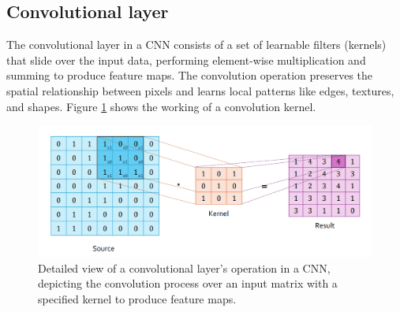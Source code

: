 \subsection{Convolutional layer}
The convolutional layer in a CNN consists of a set of learnable filters (kernels) that slide over the input data, performing element-wise multiplication and summing to produce feature maps. The convolution operation preserves the spatial relationship between pixels and learns local patterns like edges, textures, and shapes. Figure \ref{fig:Conv1} shows the working of a convolution kernel. 
\begin{figure}[ht]
    \centeringflo
    \includegraphics[width=14cm]{images/Theory-DL/Conv1.png}
    \caption{Detailed view of a convolutional layer's operation in a CNN, depicting the convolution process over an input matrix with a specified kernel to produce feature maps.}
    \label{fig:Conv1}
  \end{figure}
